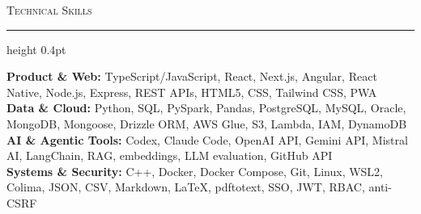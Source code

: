 \documentclass[letterpaper,11pt]{article}
\newcommand{\resumesection}[1]{%
  \par\vspace{2pt}%
  {\large\scshape #1}\par\vspace{2pt}%
  \hrule height 0.4pt\vspace{2pt}%
}
\begin{document}
\resumesection{Technical Skills}
\textbf{Product \& Web:} TypeScript/JavaScript, React, Next.js, Angular, React Native, Node.js, Express, REST APIs, HTML5, CSS, Tailwind CSS, PWA\\
\textbf{Data \& Cloud:} Python, SQL, PySpark, Pandas, PostgreSQL, MySQL, Oracle, MongoDB, Mongoose, Drizzle ORM, AWS Glue, S3, Lambda, IAM, DynamoDB\\
\textbf{AI \& Agentic Tools:} Codex, Claude Code, OpenAI API, Gemini API, Mistral AI, LangChain, RAG, embeddings, LLM evaluation, GitHub API\\
\textbf{Systems \& Security:} C++, Docker, Docker Compose, Git, Linux, WSL2, Colima, JSON, CSV, Markdown, LaTeX, pdftotext, SSO, JWT, RBAC, anti-CSRF
\end{document}
